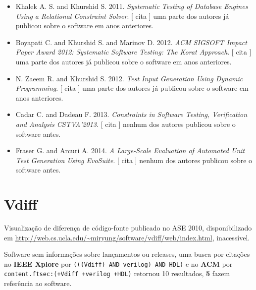 \begin{itemize}
      [
          cita
      ]
uma parte dos autores já publicou sobre o software em anos anteriores.
\item Khalek A. S. and Khurshid S.
      2011.
        \textit{ Systematic Testing of Database Engines Using a Relational Constraint Solver}.
      [
          cita
      ]
uma parte dos autores já publicou sobre o software em anos anteriores.
\item Boyapati C. and Khurshid S. and Marinov D.
      2012.
        \textit{ ACM SIGSOFT Impact Paper Award 2012: Systematic Software Testing: The Korat Approach}.
      [
          cita
      ]
uma parte dos autores já publicou sobre o software em anos anteriores.
\item N. Zaeem R. and Khurshid S.
      2012.
        \textit{ Test Input Generation Using Dynamic Programming}.
      [
          cita
      ]
uma parte dos autores já publicou sobre o software em anos anteriores.
\item Cadar C. and Dadeau F.
      2013.
        \textit{ Constraints in Software Testing, Verification and Analysis CSTVA'2013}.
      [
          cita
      ]
nenhum dos autores publicou sobre o software antes.
\item Fraser G. and Arcuri A.
      2014.
        \textit{ A Large-Scale Evaluation of Automated Unit Test Generation Using EvoSuite}.
      [
          cita
      ]
nenhum dos autores publicou sobre o software antes.
\end{itemize}
\section{Vdiff}

Visualização de diferença de código-fonte
publicado no ASE 2010,
disponibilizado em \url{http://web.cs.ucla.edu/~miryung/software/vdiff/web/index.html},
inacessível.

Software sem informações sobre lançamentos ou releases,
uma busca por citações no {\bf IEEE Xplore} por
\texttt{(((Vdiff) AND verilog) AND HDL)}
e no {\bf ACM} por
\texttt{content.ftsec:(+Vdiff +verilog +HDL)}
retornou
10 resultados,
{\bf 5} fazem referência ao software.



